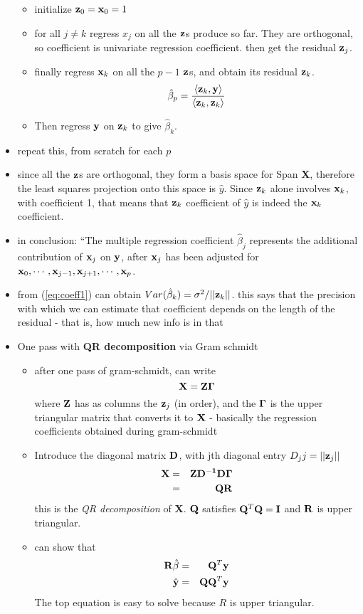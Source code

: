 \documentclass[a4paper]{report}
\newcommand{\<}{\textless}
\newcommand{\yh}{\hat{y}}
\newcommand{\bX}{{\bf{X}}}
\newcommand{\bx}{{\bf{x}}}
\newcommand{\by}{{\bf{y}}}
\renewcommand{\>}{\textgreater}
\begin{document}
\begin{itemize}
\begin{itemize}
       \item initialize ${\bf z}_0 = \bx_0 = 1$
       \item for all $j \neq k$ regress $x_j$ on all the ${\bf z}$s produce so far. They are orthogonal, so coefficient is univariate regression coefficient.
	 \subitem then get the residual ${\bf z}_j$. 
       \item finally regress $\bx_k$ on all the $p-1$ ${\bf z}$s, and obtain its residual ${\bf z}_k$.
	 \begin{equation}
	   \hat{\beta}_p = \frac{\langle {\bf z}_k, \by \rangle}{\langle {\bf z}_k, {\bf z}_k \rangle} \label{eq:coeff1}
	 \end{equation}
       \item Then regress $\by$ on ${\bf z}_k$ to give ${\hat{\beta}}_k$.
     \end{itemize}
   \item repeat this, from scratch for each $p$
   \item since all the ${\bf z}$s are orthogonal, they form a basis space for Span \bX, therefore the least squares projection onto this space is ${\yh}$. Since ${\bf z}_k$ alone involves $\bx_k$, with coefficient 1, that means that ${\bf z}_k$ coefficient of $\yh$ is indeed the $\bx_k$ coefficient.
   \item in conclusion: ``The multiple regression coefficient $\hat{\beta}_j$ represents the additional contribution of $\bx_j$ on $\by$, after $\bx_j$ has been adjusted for $\bx_0, \cdots, \bx_{j-1}, \bx_{j+1},\cdots,\bx_p$.
   \item from (\ref{eq:coeff1}) can obtain $Var(\hat{\beta}_k) = \sigma^2/||{\bf z}_k||$.
     \subitem this says that the precision with which we can estimate that coefficient depends on the length of the residual - that is, how much new info is in that 
   \item One pass with {\bf QR decomposition} via Gram schmidt
     \begin{itemize}
       \item after one pass of gram-schmidt, can write
	 $$ \bX = {\bf Z}{\bf \Gamma} $$
	where ${\bf Z}$ has as columns the ${\bf z}_j$ (in order), and the ${\bf \Gamma}$ is the upper triangular matrix that converts it to $\bX$ - basically the regression coefficients obtained during gram-schmidt
      \item Introduce the diagonal matrix ${\bf D}$, with jth diagonal entry $D_jj = ||{\bf z}_j||$
	\begin{eqnarray}
	  \bX &=& {\bf Z D^{-1} D \Gamma } \\
	   &=& {\bf QR}
	\end{eqnarray}
	this is the \emph{QR decomposition} of \bX. ${\bf Q}$ satisfies ${\bf Q}^T{\bf Q} = {\bf I}$ and ${\bf R}$ is upper triangular.
      \item can show that
	\begin{eqnarray}
	  {\bf R}\hat{\beta}  &=& {\bf Q}^T\by \\
	  \hat{\by} &=& {\bf QQ}^{T}\by
	\end{eqnarray}
	The top equation is easy to solve because $R$ is upper triangular.


\end{itemize}
\end{itemize}
\end{document}
